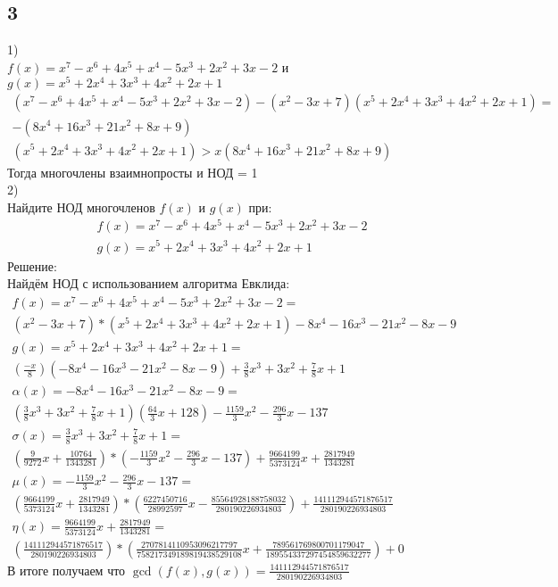 		\subsection{3}	
		1)\\
		$f(x) = x^7 - x^6 + 4x^5 + x^4 - 5x^3 + 2x^2 + 3x - 2$ и $g(x) = x^5 + 2x^4 + 3x^3 + 4x^2 + 2x + 1$\\
		\begin{gather*}
		(x^7 - x^6 + 4x^5 + x^4 - 5x^3 + 2x^2 + 3x - 2) - (x^2 -3x + 7) (x^5 + 2x^4 + 3x^3 + 4x^2 + 2x + 1) =\\ -(8 x^4 + 16 x^3 + 21 x^2 + 8 x + 9)\\
		(x^5 + 2x^4 + 3x^3 + 4x^2 + 2x + 1) > x(8 x^4 + 16 x^3 + 21 x^2 + 8 x + 9)	
		\end{gather*}
		Тогда многочлены взаимнопросты и НОД = 1
		\\
		2)\\
		Найдите НОД многочленов $f(x)$ и $g(x)$ при: \\
		\begin{gather*}
		f(x) = x^7-x^6+4x^5+x^4-5x^3+2x^2+3x-2 \\
		g(x) = x^5+2x^4+3x^3+4x^2+2x+1
		\end{gather*}
		Решение:\\
		Найдём НОД с использованием алгоритма Евклида:\\
		\begin{gather*}
		f(x) = x^7-x^6+4x^5+x^4-5x^3+2x^2+3x-2 = \\
		(x^2-3x+7)*(x^5+2x^4+3x^3+4x^2+2x+1)-8x^4-16x^3-21x^2-8x-9\\
		g(x) = x^5+2x^4+3x^3+4x^2+2x+1 = \\(\frac{-x}{8})(-8x^4-16x^3-21x^2-8x-9) + \frac{3}{8}x^3+3x^2+\frac{7}{8}x+1\\
		\alpha(x) = -8x^4-16x^3-21x^2-8x-9 = \\(\frac{3}{8}x^3+3x^2+\frac{7}{8}x+1)(\frac{64}{3}x+128) -\frac{1159}{3}x^2-\frac{296}{3}x-137\\
		\sigma(x) = \frac{3}{8}x^3+3x^2+\frac{7}{8}x+1 = \\(\frac{9}{9272}x + \frac{10764}{1343281})*(-\frac{1159}{3}x^2-\frac{296}{3}x-137)+\frac{9664199}{5373124}x+ \frac{2817949}{1343281}\\
		\mu(x) = -\frac{1159}{3}x^2-\frac{296}{3}x-137 = \\(\frac{9664199}{5373124}x+ \frac{2817949}{1343281})*(\frac{6227450716}{28992597}x-\frac{85564928188758032}{280190226934803}) + \frac{141112944571876517}{280190226934803}\\
		\eta(x) = \frac{9664199}{5373124}x+ \frac{2817949}{1343281} =\\ (\frac{141112944571876517}{280190226934803})*(\frac{2707814110953096217797}{758217349189819438529108}x + \frac{789561769800701179047}{189554337297454859632277}) + 0
		\end{gather*}
		В итоге получаем что $\gcd(f(x),g(x)) = \frac{141112944571876517}{280190226934803}$
		
